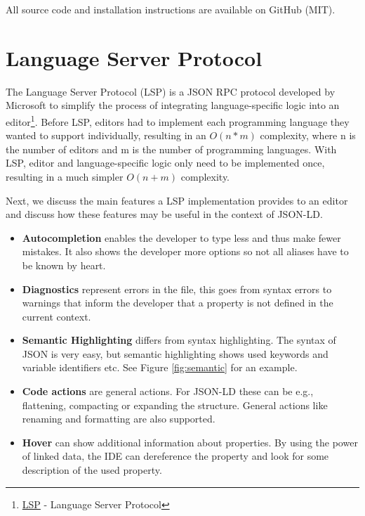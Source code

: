 \documentclass[
]{ceurart}
\begin{document}
All source code and installation instructions are available on GitHub (MIT).


\section{Language Server Protocol}

The Language Server Protocol (LSP) is a JSON RPC protocol developed by Microsoft to simplify the process of integrating language-specific logic into an editor\footnote{\href{https://microsoft.github.io/language-server-protocol/}{LSP} - Language Server Protocol}. 
Before LSP, editors had to implement each programming language they wanted to support individually, resulting in an \(O(n*m)\) complexity, where n is the number of editors and m is the number of programming languages.
With LSP, editor and language-specific logic only need to be implemented once, resulting in a much simpler \(O(n+m)\) complexity\cite{LSP-Multi}.

Next, we discuss the main features a LSP implementation provides to an editor and discuss how these features may be useful in the context of JSON-LD.

\begin{itemize}
  \item \textbf{Autocompletion} enables the developer to type less and thus make fewer mistakes. It also shows the developer more options so not all aliases have to be known by heart.
  \item \textbf{Diagnostics} represent errors in the file, this goes from syntax errors to warnings that inform the developer that a property is not defined in the current context.
  \item \textbf{Semantic Highlighting} differs from syntax highlighting. The syntax of JSON is very easy, but semantic highlighting shows used keywords and variable identifiers etc. See Figure \ref{fig:semantic} for an example.
  \item \textbf{Code actions} are general actions. For JSON-LD these can be e.g., flattening, compacting or expanding the structure. General actions like renaming and formatting are also supported.
  \item \textbf{Hover} can show additional information about properties. By using the power of linked data, the IDE can dereference the property and look for some description of the used property.
\end{itemize}
\end{document}
